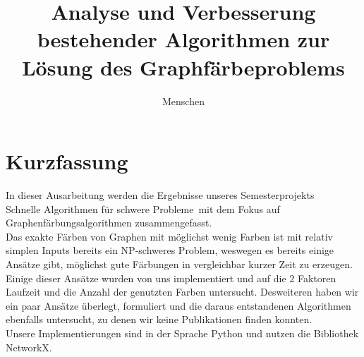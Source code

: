 \documentclass[11pt]{article}
\title{Analyse und Verbesserung bestehender Algorithmen zur Lösung des Graphfärbeproblems}
\author{Menschen} %
\begin{document}
\maketitle

\tableofcontents
\newpage

\section{Kurzfassung} %

In dieser Ausarbeitung werden die Ergebnisse unseres Semesterprojekts\\
\grqq Schnelle Algorithmen für schwere Probleme\grqq\ mit dem Fokus auf
Graphenfärbungsalgorithmen zusammengefasst. \\ 
Das exakte Färben von Graphen mit möglichst wenig Farben ist mit relativ simplen Inputs bereits ein NP-schweres Problem, weswegen es bereits einige Ansätze gibt,
möglichst gute Färbungen in vergleichbar kurzer Zeit zu erzeugen. Einige dieser Ansätze wurden von uns implementiert und auf die $2$ Faktoren 
Laufzeit und die Anzahl der genutzten Farben untersucht.
Desweiteren haben wir ein paar Ansätze überlegt, formuliert und die daraus entstandenen Algorithmen ebenfalls untersucht, zu denen wir keine Publikationen finden konnten. \\
Unsere Implementierungen sind in der Sprache Python und nutzen die Bibliothek NetworkX.
\end{document}
